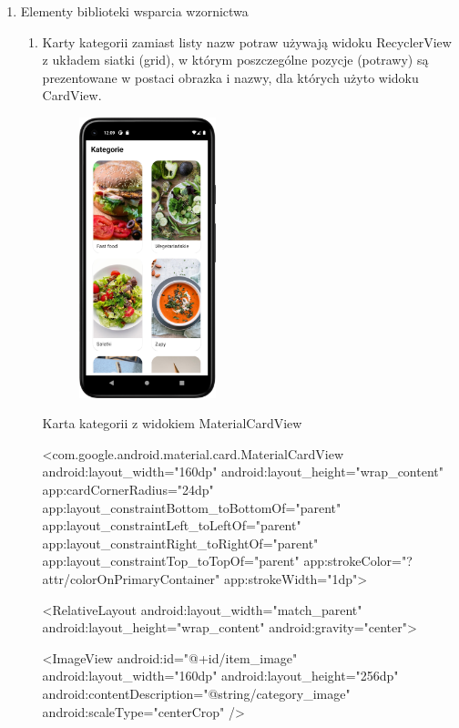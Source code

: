 \documentclass{article}
\begin{document}
\begin{enumerate}
\item Elementy biblioteki wsparcia wzornictwa


\begin{enumerate}
    \item Karty kategorii zamiast listy nazw potraw używają 
    widoku RecyclerView z układem siatki (grid), 
    w którym poszczególne pozycje (potrawy) są prezentowane 
    w postaci obrazka i nazwy, dla których użyto widoku CardView. 

    \begin{figure}[ht]
        \centering
        \includegraphics[width=0.4\textwidth]{../res/category_view}
    \end{figure}
\newpage

Karta kategorii z widokiem MaterialCardView
\begin{mylisting}
<com.google.android.material.card.MaterialCardView
    android:layout_width="160dp"
    android:layout_height="wrap_content"
    app:cardCornerRadius="24dp"
    app:layout_constraintBottom_toBottomOf="parent"
    app:layout_constraintLeft_toLeftOf="parent"
    app:layout_constraintRight_toRightOf="parent"
    app:layout_constraintTop_toTopOf="parent"
    app:strokeColor="?attr/colorOnPrimaryContainer"
    app:strokeWidth="1dp">

    <RelativeLayout
        android:layout_width="match_parent"
        android:layout_height="wrap_content"
        android:gravity="center">

        <ImageView
            android:id="@+id/item_image"
            android:layout_width="160dp"
            android:layout_height="256dp"
            android:contentDescription="@string/category_image"
            android:scaleType="centerCrop" />


\end{mylisting}
\end{enumerate}
\end{enumerate}
\end{document}
